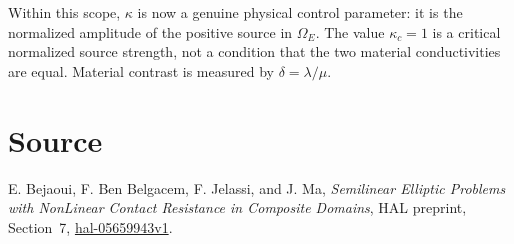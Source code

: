 \documentclass[10pt,a4paper]{article}
\begin{document}
Within this scope, \(\kappa\) is now a genuine physical control parameter: it
is the normalized amplitude of the positive source in \(\Omega_E\). The value
\(\kappa_c=1\) is a critical normalized source strength, not a condition that
the two material conductivities are equal. Material contrast is measured by
\(\delta=\lambda/\mu\).

\section*{Source}

E. Bejaoui, F. Ben Belgacem, F. Jelassi, and J. Ma,
\emph{Semilinear Elliptic Problems with NonLinear Contact Resistance in
Composite Domains}, HAL preprint, Section~7,
\href{https://hal.science/hal-05659943v1/document}
{hal-05659943v1}.
\end{document}

